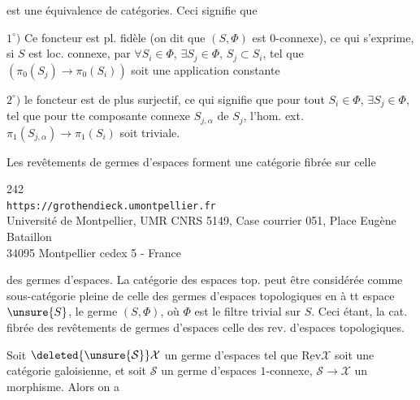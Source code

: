 est une équivalence de catégories. Ceci signifie que

$1^\circ)$ Ce foncteur est pl. fidèle (on dit que $(S,\Phi)$ est $0$-connexe), ce qui s'exprime, si $S$ est loc. connexe, par $\forall S_i\in\Phi$, $\exists S_j\in\Phi$, $S_j\subset S_i$, tel que  $(\pi_0(S_j)\longrightarrow\pi_0(S_i))$ soit une application constante


$2^\circ)$ le foncteur est de plus  surjectif, ce qui signifie que pour tout $S_i\in\Phi$, $\exists S_j\in\Phi$,  tel que pour tte composante connexe $S_{j,\alpha}$ de $S_j$, l'hom. ext. $\pi_1(S_{j,\alpha})\longrightarrow\pi_1(S_i)$ soit triviale.

Les revêtements de germes d'espaces forment une catégorie fibrée sur celle


\begin{center}
242\\
\texttt{https://grothendieck.umontpellier.fr}\\
Université de Montpellier, UMR CNRS 5149, Case courrier 051, Place Eugène Bataillon\\
34095 Montpellier cedex 5 - France
\end{center}


des germes d'espaces. La catégorie des espaces top.  peut être considérée comme sous-catégorie pleine de celle des germes d'espaces topologiques en  à tt espace $\unsure{S}$, le germe $(S,\Phi)$, où $\Phi$ est le filtre trivial sur $S$. Ceci étant, la cat. fibrée des revêtements de germes d'espaces  celle des rev. d'espaces topologiques.

Soit $\deleted{\unsure{\mathcal S}}\mathcal X$ un germe d'espaces tel que $\underline{\mathrm{Rev}}\mathcal X$ soit une catégorie galoisienne,  et soit $\mathcal S$ un germe d'espaces $1$-connexe, $\mathcal S\longrightarrow\mathcal X$ un morphisme. Alors on a


